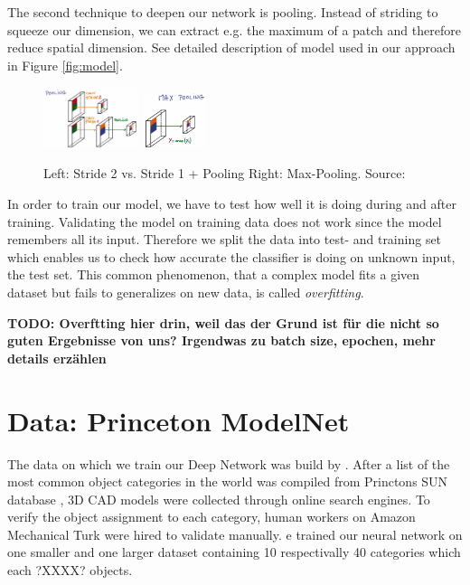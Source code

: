 \documentclass[10pt,twocolumn,letterpaper]{article}
\begin{document}
The second technique to deepen our network is pooling. Instead of striding to squeeze our dimension, we can extract e.g. the maximum of a patch and therefore reduce spatial dimension. 
See detailed description of model used in our approach in Figure \ref{fig:model}.

\begin{figure}[h]
	\label{fig:pooling}
	\includegraphics[width=0.25\textwidth]{figures/con_max}
	\includegraphics[width=0.16\textwidth]{figures/max}
	\caption{Left: Stride 2 vs. Stride 1 + Pooling \quad Right: Max-Pooling. Source: \cite{udacity}}
\end{figure}

In order to train our model, we have to test how well it is doing during and after training. 
Validating the model on training data does not work since the model remembers all its input. Therefore we split the data into test- and training set which enables us to check how accurate the classifier is doing on unknown input, the test set. This common phenomenon, that a complex model fits a given dataset but fails to generalizes on new data, is called \textit{overfitting}.

\textbf{TODO: Overftting hier drin, weil das der Grund ist für die nicht so guten Ergebnisse von uns?
Irgendwas zu batch size, epochen, mehr details erzählen}

\section{Data: Princeton ModelNet}
\label{data:modelnet}

The data on which we train our Deep Network was build by \cite{shape}. After a list of the most
common object categories in the world was compiled from Princtons SUN database \cite{sun}, 3D CAD models were collected through online 
search engines. To verify the object assignment to each category, human workers on Amazon Mechanical Turk were hired to validate manually. 
e trained our neural network on one smaller and one larger dataset containing 10 respectivally 40 categories which each ?XXXX? objects.
\end{document}
